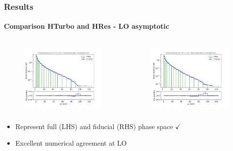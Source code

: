 \documentclass[aspectratio=43]{beamer}
\begin{document}
\begin{frame}
	
	\frametitle{Results}
	\framesubtitle{Comparison HTurbo and HRes - LO asymptotic}
	
	\begin{columns}
		
		
		\begin{figure}
			\includegraphics[width = 7cm]{plots/part3/chapter6/nlo-ct-1.png}
		\end{figure}
		
		
		\begin{figure}
			\includegraphics[width = 7cm]{plots/part3/chapter6/nlo-ct-fid-1.png}
		\end{figure}
		
	\end{columns}
	
	\begin{itemize}
		\item \footnotesize Represent full (LHS) and fiducial (RHS) phase space {\color{darkgreen}$\checkmark$} 
		\item \footnotesize Excellent numerical agreement at LO
	\end{itemize}

\end{frame}
\end{document}
